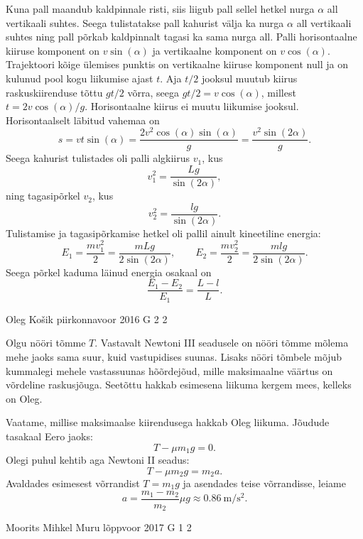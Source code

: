 \documentclass[11pt]{article}
\begin{document}
{{\ifSolution
Kuna pall maandub kaldpinnale risti, siis liigub pall sellel hetkel nurga $\alpha$ all vertikaali suhtes. Seega tulistatakse pall kahurist välja ka nurga $\alpha$ all vertikaali suhtes ning pall põrkab kaldpinnalt tagasi ka sama nurga all. Palli horisontaalne kiiruse komponent on $v\sin(\alpha)$ ja vertikaalne komponent on $v\cos(\alpha)$. Trajektoori kõige ülemises punktis on vertikaalne kiiruse komponent null ja on kulunud pool kogu liikumise ajast $t$. Aja $t/2$ jooksul muutub kiirus raskuskiirenduse tõttu $gt/2$ võrra, seega $gt/2 =v\cos(\alpha)$, millest $t=2v\cos(\alpha)/g$. Horisontaalne kiirus ei muutu liikumise jooksul. Horisontaalselt läbitud vahemaa on $$s=vt\sin(\alpha)=\frac{2v^2\cos(\alpha)\sin(\alpha)}{g} = \frac{v^2\sin(2\alpha)}{g}.$$
Seega kahurist tulistades oli palli algkiirus $v_1$, kus
\[ v_1^2 = \frac{Lg}{\sin(2\alpha)}, \]
ning tagasipõrkel $v_2$, kus
\[ v_2^2 = \frac{lg}{\sin(2\alpha)}. \]
Tulistamise ja tagasipõrkamise hetkel oli pallil ainult kineetiline energia:
\[ E_1 = \frac{mv_1^2}{2}=\frac{mLg}{2\sin(2\alpha)},\quad\quad E_2 =\frac{mv_2^2}{2} = \frac{mlg}{2\sin(2\alpha)}. \]
Seega põrkel kaduma läinud energia osakaal on
\[ \frac{E_1-E_2}{E_1} = \frac{L-l}{L}. \]
\fi
}

{Oleg Košik} %
{piirkonnavoor} %
{2016} %
{G 2} %
{2} %
{

\ifSolution
Olgu nööri tõmme $T$. Vastavalt Newtoni III seadusele on nööri tõmme mõlema mehe jaoks sama suur, kuid vastupidises suunas. Lisaks nööri tõmbele mõjub kummalegi mehele vastassuunas hõõrdejõud, mille maksimaalne väärtus on võrdeline raskusjõuga. Seetõttu hakkab esimesena liikuma kergem mees, kelleks on Oleg.

Vaatame, millise maksimaalse kiirendusega hakkab Oleg liikuma.
Jõudude tasakaal Eero jaoks:
\[
T-\mu m_1g = 0.
\]
Olegi puhul kehtib aga Newtoni II seadus:
\[
T-\mu m_2g = m_2a.
\]
Avaldades esimesest võrrandist $T=m_1g$ ja asendades teise võrrandisse, leiame
\[
a = \frac{m_1-m_2}{m_2}\mu g \approx \SI{0,86}{\meter \per \second\squared}.
\]
\fi
}

{Moorits Mihkel Muru} %
{lõppvoor} %
{2017} %
{G 1} %
{2} %
{

}}
\end{document}
